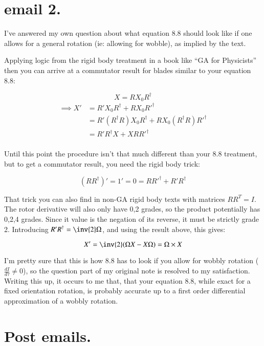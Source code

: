 \section{email 2. } 

I've answered my own question about what equation 8.8 should look like if one allows for a general rotation (ie: allowing for wobble), as implied by the text.

Applying logic from the rigid body treatment in a book like ``GA for Physicists'' then you can arrive at a commutator result for blades similar to your equation 8.8:

\[
X = R X_0 R^\dagger
\]
\begin{align*}
\implies
X' &= R' X_0 R^\dagger + R X_0 {R'}^\dagger \\
   &= R' (R^\dagger R) X_0 R^\dagger + R X_0 (R^\dagger R) {R'}^\dagger \\
   &= R' R^\dagger X + X R {R'}^\dagger \\
\end{align*}

Until this point the procedure isn't that much different than your 8.8 treatment, but to get a commutator result, you need the rigid body trick:

\[
(R R^\dagger)' = 1' = 0 = R {R'}^\dagger + R' R^\dagger
\]

That trick you can also find in non-GA rigid body texts with matrices $R R^T = I$.  The rotor derivative will also only have 0,2 grades, so the product potentially has 0,2,4 grades.  Since it value is the negation of its reverse, it must be strictly grade 2.  Introducing $R' R^\dagger = \inv{2} \Omega$, and using the result above, this gives:

\[
X' = \inv{2}(\Omega X - X \Omega) = \Omega \times X
\]


I'm pretty sure that this is how 8.8 has to look if you allow for wobbly rotation ($\frac{dI}{d\tau} \ne 0$), so the question part of my original note is resolved to my satisfaction.  Writing this up, it occurs to me that, that your equation 8.8, while exact for a fixed orientation rotation, is probably accurate up to a first order differential approximation of a wobbly rotation.

\section{Post emails. }

